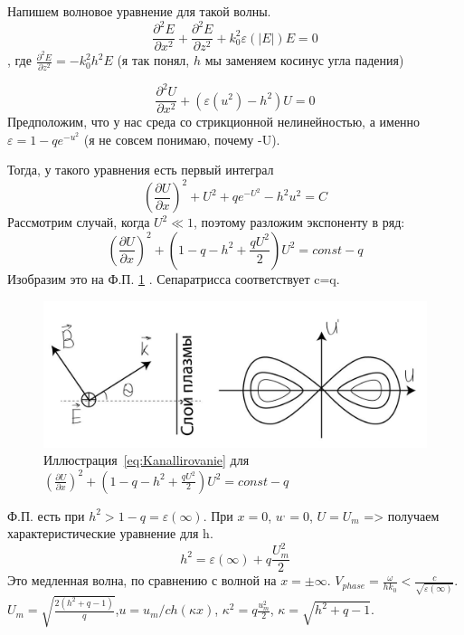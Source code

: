 \documentclass[10pt, a4paper]{article}
\begin{document}
Напишем волновое уравнение для такой волны.
\begin{equation}
	\frac{\partial^2 E}{\partial x^2} + \frac{\partial^2 E}{\partial z^2} + k_0^2 \varepsilon(|E|) E=0
\end{equation}
, где $ \frac{\partial^2 E}{\partial z^2}=-k_0^2h^2E$ (я так понял, $h$ мы заменяем косинус угла падения)

\begin{equation}
	\frac{\partial^2 U}{\partial x^2} + (\varepsilon(u^2)-h^2)U=0
\end{equation}
Предположим, что у нас среда со стрикционной нелинейностью, а именно $\varepsilon=1-q e^{-u^2}$ (я не совсем понимаю, почему -U).

Тогда, у такого уравнения есть первый интеграл
\begin{equation}
	(\frac{\partial U}{\partial x})^2 + U^2 +q e^{-U^2} - h^2u^2=C
\end{equation}
Рассмотрим случай, когда $U^2 \ll 1$, поэтому разложим экспоненту в ряд:
\begin{equation}
	(\frac{\partial U}{\partial x})^2 + (1-q-h^2+\frac{qU^2}{2})U^2=const - q
	\label{eq:Kanallirovanie}
\end{equation}
Изобразим это на Ф.П. \ref{fig:Kanallirovanie} . Сепаратрисса соответствует c=q.
\begin{figure}
	\begin{center}
		\includegraphics[width=0.5\linewidth]{Kanallirovanie.JPG}
	\end{center}
\caption{Иллюстрация~\eqref{eq:Kanallirovanie} для $(\frac{\partial U}{\partial x})^2 + (1-q-h^2+\frac{qU^2}{2})U^2=const - q$}		
\label{fig:Kanallirovanie}
\end{figure}

Ф.П. есть при $h^2> 1-q=\varepsilon(\infty)$. При $x=0$, $u^{,}=0$, $U=U_m$ => получаем характеристические уравнение для h.
\begin{equation}
	h^2=\varepsilon(\infty)+q \frac{U^2_m}{2}
\end{equation}
Это медленная волна, по сравнению с волной на $x= \pm \infty$. $V_{phase}=\frac{\omega}{h k_0}< \frac{c}{\sqrt{\varepsilon(\infty)}}$. $U_m=\sqrt{\frac{2(h^2+q-1)}{q}}$,$u=u_m / ch(\kappa x)$, $\kappa^2=q \frac{u_m^2}{2}$, $\kappa=\sqrt{h^2+q-1}$.
\end{document}

